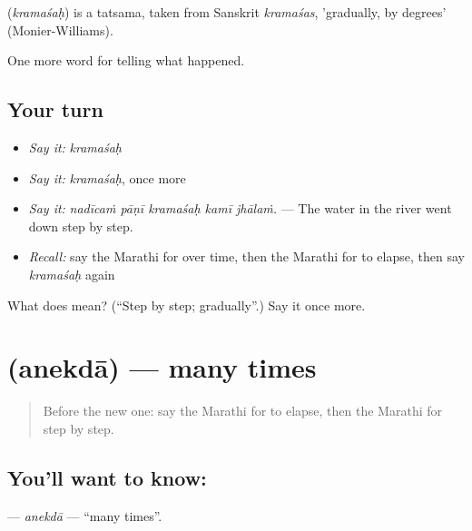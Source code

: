 \begin{cousinweb}
\textbf{} (\emph{kramaśaḥ}) is a tatsama, taken from Sanskrit \emph{kramaśas}, 'gradually, by degrees' (Monier-Williams).
\end{cousinweb}

\begin{grammarlens}[title={What you've built}]
One more word for telling what happened.
\end{grammarlens}

\subsection*{Your turn}
\begin{itemize}
\raggedright
  \item \emph{Say it:} \emph{kramaśaḥ}
  \item \emph{Say it:} \emph{kramaśaḥ}, once more
  \item \emph{Say it:} \emph{nadīcaṁ pāṇī kramaśaḥ kamī jhālaṁ.} — The water in the river went down step by step.
  \item \emph{Recall:} say the Marathi for over time, then the Marathi for to elapse, then say \emph{kramaśaḥ} again
\end{itemize}

\begin{tcolorbox}[breakable,colback=teal!4,colframe=teal!35!black,title={Before you move on}]
What does  mean? (\textquotedblleft{}Step by step; gradually\textquotedblright{}.) Say it once more.
\end{tcolorbox}
\section[\texorpdfstring{\mr{अनेकदा} (anekdā)}{अनेकदा (anekdā)}]{ (anekdā) — many times}

\label{lesson:MR-C306-anekda}



\begin{quote}
Before the new one: say the Marathi for to elapse, then the Marathi for step by step.
\end{quote}

\subsection*{You'll want to know: }
\textbf{} — \emph{anekdā} — \textquotedblleft{}many times\textquotedblright{}.

